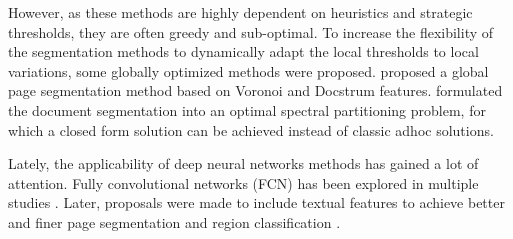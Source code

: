 \documentclass[letterpaper]{article} %
\begin{document}
However, as these methods are highly dependent on heuristics and strategic thresholds, they are often greedy and sub-optimal. To increase the flexibility of the segmentation methods to dynamically adapt the local thresholds to local variations, some globally optimized methods were proposed. \cite{DBLP:conf/icdar/AgrawalD09a}
proposed a global page segmentation method based on Voronoi and Docstrum features.
\cite{DBLP:conf/icvgip/DasigiJJ08} formulated the document segmentation into an optimal spectral partitioning problem, for which a closed form solution can be achieved instead of classic adhoc solutions.

Lately, the applicability of deep neural networks methods has gained a lot of attention. Fully convolutional networks (FCN) has been explored in multiple studies \cite{DBLP:conf/icfhr/OliveiraSK18} \cite{DBLP:conf/das/WickP18} \cite{DBLP:conf/icdar/MeierSSAC17}. Later, proposals were made to include textual features to achieve better and finer page segmentation and region classification \cite{DBLP:journals/corr/abs-2002-06144} \cite{DBLP:conf/emnlp/KattiRGBBHF18}. 
\end{document}
